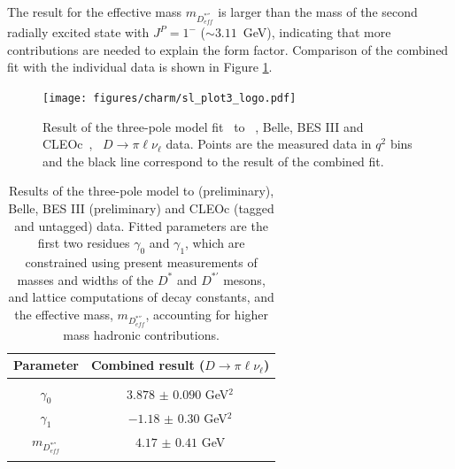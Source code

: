 The result for the effective mass $m_{D^{\ast ''}_{eff}}$ is larger than the mass of the 
second radially excited state with $J^P = 1^{-}$ ($\sim 3.11$~GeV), indicating that more contributions are needed to explain the form factor. 
Comparison of the combined fit with the individual data is shown in Figure \ref{plot3}.

\begin{figure}[p]
\begin{center}
\texttt{[image: figures/charm/sl\_plot3\_logo.pdf]}
\caption{Result of the three-pole model fit~\cite{Becirevic:2014kaa} to \babar~\cite{Lees:2014jka}, Belle\cite{Widhalm:2006wz}, 
BES III\cite{BESIII-new} and CLEOc~\cite{Besson:2009uv},~\cite{Dobbs:2007aa} $D \to \pi \ell \nu_\ell $ data. Points are the 
measured data in $q^2$ bins and the black line correspond to the result of the combined fit.
\label{plot3}
}
\end{center}
\end{figure}


\begin{table}[htbp]
\caption{Results of the three-pole model to \babar (preliminary), Belle, BES III (preliminary) and CLEOc (tagged and untagged) data. 
Fitted parameters are the first two residues 
$\gamma_0$  and $\gamma_{1}$, which are constrained using present measurements 
of masses and widths of the $D^\ast$ and $D^{\ast '}$ mesons, and lattice computations of decay constants, and the effective mass,  
$m_{D^{\ast ''}_{eff}}$, 
accounting for higher mass hadronic contributions. 
\label{3Pole_pi}}
\begin{center}
\begin{tabular}{cc}
\hline 
Parameter & Combined result ($D \to \pi \ell \nu_\ell $) \\ 
\hline 
\vspace*{-10pt} & \\
\hline
$\gamma_0$  & $3.878$ $\pm$ $0.090$  GeV$^2$ \\
$\gamma_1$  & $-1.18$ $\pm$ $0.30$  GeV$^2$  \\
$m_{D^{\ast ''}_{eff}}$  & $4.17$ $\pm$ $0.41$ GeV \\
\hline
\vspace*{-10pt} & \\
\hline
\end{tabular}
\end{center}
\end{table}

